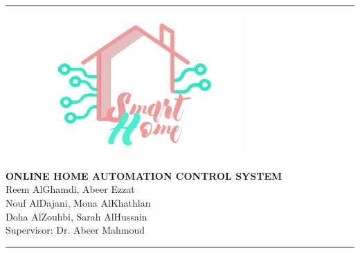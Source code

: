 \documentclass[12pt]{paper}
\begin{document}

\begin{titlepage}
	\begin{center}
		\hspace{0pt}\\
		\vspace{3cm}
		\begin{center}
	\hspace{0pt}\\
	
	\hrule	
	\vspace{.5cm}	
	\begin{minipage}{0.3\linewidth}
		\begin{figure}[H]
			\includegraphics[width=\linewidth]{img/logo.png}
		\end{figure}
	\end{minipage} \hfill
	\begin{minipage}{.6\linewidth}
		\begin{center}
			{{\large\bfseries\uppercase{Online Home Automation Control System}}}\\			
			\vspace{.5cm}	
			Reem AlGhamdi, Abeer Ezzat\\Nouf AlDajani, Mona AlKhathlan\\ Doha  AlZouhbi, Sarah AlHussain 
			\\\vspace{.5cm}	
			Supervisor: Dr. Abeer Mahmoud
		\end{center}
	\end{minipage}	
	\vspace{.5cm}	
	\hrule height 1mm
\end{center}
		

\end{center}
\end{titlepage}
\end{document}
